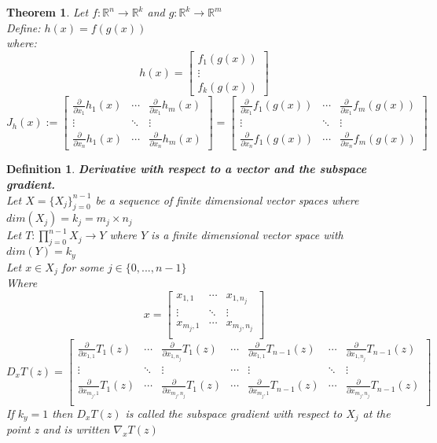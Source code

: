 \documentclass[12pt]{extarticle}
\theoremstyle{plain}
\newtheorem{thm}{Theorem}[section]
\theoremstyle{Definition}
\newtheorem{def.}{Definition}[section]
\theoremstyle{Definition}
\theoremstyle{plain}
\begin{document}
\begin{thm}
	Let $f : \mathbb{R}^n \to \mathbb{R}^k$ and $g : \mathbb{R}^k \to \mathbb{R}^m$ \\ 
	Define: $h(x) = f(g(x))$ \\ 
	where: \\ 
	\[
	h(x) = 
	\begin{bmatrix}
	f_1(g(x)) \\ 
	\vdots \\
	f_k(g(x))
	\end{bmatrix}
	\]	
	\[
	J_h(x) := 
	\begin{bmatrix} 
	\frac{\partial }{\partial x_1}h_1(x) & \cdots & \frac{\partial }{\partial x_1}h_m(x) \\
	\vdots & \ddots & \vdots \\ 
	\frac{\partial }{\partial x_n}h_1(x) & \cdots & \frac{\partial }{\partial x_n}h_m(x) 
	\end{bmatrix}
	= 
	\begin{bmatrix} 
	\frac{\partial }{\partial x_1}f_1(g(x)) & \cdots & \frac{\partial }{\partial x_1}f_m(g(x)) \\
	\vdots & \ddots & \vdots \\ 
	\frac{\partial }{\partial x_n}f_1(g(x)) & \cdots & \frac{\partial }{\partial x_n}f_m(g(x)) 
	\end{bmatrix}
	\]
\end{thm}
\begin{def.} \textbf{Derivative with respect to a vector and the subspace gradient.} \\ 
	Let $X = \{X_j\}_{j=0}^{n-1}$ be a sequence of finite dimensional vector spaces where $dim(X_j) = k_j = m_j \times n_j$ \\ 
	Let $T : \prod_{j=0}^{n-1} X_j \to Y$ where $Y$ is a finite dimensional vector space with $dim(Y) = k_y$ \\ 
	Let $x \in X_j$ for some $j \in \{0,...,n-1\}$ \\ 
	Where 
	\[
	x = 
	\begin{bmatrix}
	x_{1,1} & \cdots & x_{1,n_j} \\ 
	\vdots & \ddots & \vdots \\
	x_{m_j,1} & \cdots & x_{m_j,n_j} \\ 	
	\end{bmatrix}
	\]
	\[
	D_x T(z) = 
	\begin{bmatrix}
	\frac{\partial}{\partial x_{1,1}} T_1(z) & \cdots & \frac{\partial}{\partial x_{1,n_j}} T_1(z) & \cdots &  \frac{\partial}{\partial x_{1,1}} T_{n-1}(z) & \cdots & \frac{\partial}{\partial x_{1,n_j}} T_{n-1}(z)\\
	\vdots & \ddots & \vdots & \cdots & \vdots & \ddots & \vdots \\
	\frac{\partial}{\partial x_{m_j,1}} T_1(z) & \cdots & \frac{\partial}{\partial x_{m_j,n_j}} T_1(z) & \cdots & \frac{\partial}{\partial x_{m_j,1}} T_{n-1}(z) & \cdots & \frac{\partial}{\partial x_{m_j,n_j}} T_{n-1}(z)\\
	\end{bmatrix}
	\]
	If $k_y = 1$ then $D_xT(z)$ is called the subspace gradient with respect to $X_j$ at the point z and is written $\nabla_x T(z)$
\end{def.}
\end{document}
